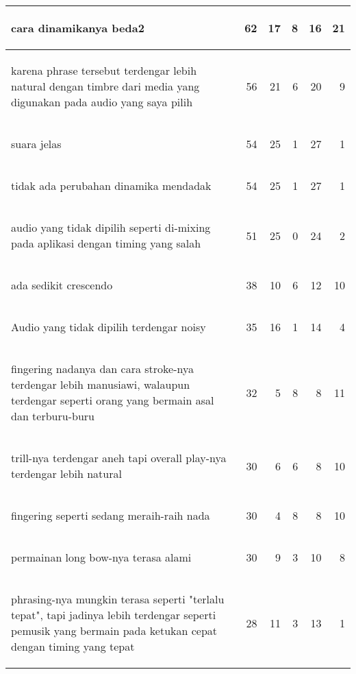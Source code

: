\begin{longtable}{|p{}|r|r|r|r|r|}
\begin{intabquote}cara dinamikanya beda2\end{intabquote}&	62&	17&	8&	16&	21\\\hline
\begin{intabquote}karena phrase tersebut terdengar lebih natural dengan timbre dari media yang digunakan pada audio yang saya pilih\end{intabquote}&	56&	21&	6&	20&	9\\\hline
\begin{intabquote}suara jelas\end{intabquote}&	54&	25&	1&	27&	1\\\hline
\begin{intabquote}tidak ada perubahan dinamika mendadak\end{intabquote}&	54&	25&	1&	27&	1\\\hline
\begin{intabquote}audio yang tidak dipilih seperti di-mixing pada aplikasi dengan timing yang salah\end{intabquote}&	51&	25&	0&	24&	2\\\hline
\begin{intabquote}ada sedikit crescendo\end{intabquote}&	38&	10&	6&	12&	10\\\hline
\begin{intabquote}Audio yang tidak dipilih terdengar noisy\end{intabquote}&	35&	16&	1&	14&	4\\\hline
\begin{intabquote}fingering nadanya dan cara stroke-nya terdengar lebih manusiawi, walaupun terdengar seperti orang yang bermain asal dan terburu-buru\end{intabquote}&	32&	5&	8&	8&	11\\\hline
\begin{intabquote}trill-nya terdengar aneh tapi overall play-nya terdengar lebih natural\end{intabquote}&	30&	6&	6&	8&	10\\\hline
\begin{intabquote}fingering seperti sedang meraih-raih nada\end{intabquote}&	30&	4&	8&	8&	10\\\hline
\begin{intabquote}permainan long bow-nya terasa alami\end{intabquote}&	30&	9&	3&	10&	8\\\hline
\begin{intabquote}phrasing-nya mungkin terasa seperti "terlalu tepat", tapi jadinya lebih terdengar seperti pemusik yang bermain pada ketukan cepat dengan timing yang tepat\end{intabquote}&	28&	11&	3&	13&	1\\\hline

\end{longtable}

